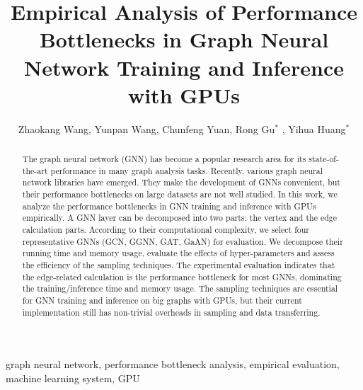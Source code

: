 \documentclass{elsarticle}
\begin{document}
\begin{frontmatter}

	\title{Empirical Analysis of Performance Bottlenecks in Graph Neural Network Training and Inference with GPUs}
    \author{Zhaokang Wang, Yunpan Wang, Chunfeng Yuan, Rong Gu$^*$ , Yihua Huang$^*$ }
	\address{State Key Laboratory for Novel Software Technology, \\Department of Computer Science and Technology, Nanjing University, \\Nanjing 210023, China}

	\begin{abstract}
		The graph neural network (GNN) has become a popular research area for its state-of-the-art performance in many graph analysis tasks.
		Recently, various graph neural network libraries have emerged.
        They make the development of GNNs convenient, but their performance bottlenecks on large datasets are not well studied.
		In this work, we analyze the performance bottlenecks in GNN training and inference with GPUs empirically.
		A GNN layer can be decomposed into two parts: the vertex and the edge calculation parts.
		According to their computational complexity, we select four representative GNNs (GCN, GGNN, GAT, GaAN) for evaluation.
		We decompose their running time and memory usage, evaluate the effects of hyper-parameters and assess the efficiency of the sampling techniques.
		The experimental evaluation indicates that the edge-related calculation is the performance bottleneck for most GNNs, dominating the training/inference time and memory usage.
        The sampling techniques are essential for GNN training and inference on big graphs with GPUs, but their current implementation still has non-trivial overheads in sampling and data transferring.
	\end{abstract}

	\begin{keyword}
		graph neural network, performance bottleneck analysis, empirical evaluation, machine learning system, GPU
	\end{keyword}

\end{frontmatter}

\linenumbers










\end{document}
